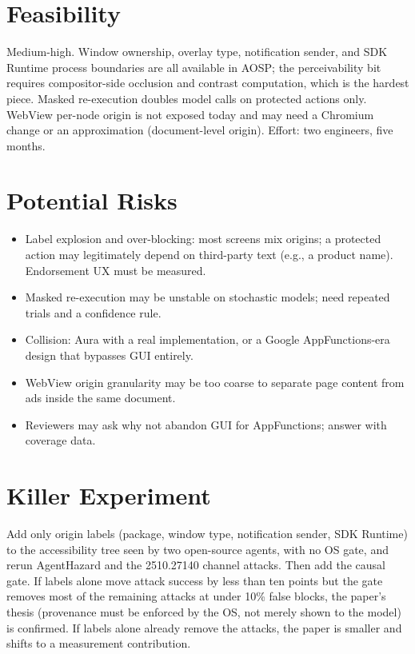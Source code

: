 \documentclass[11pt]{article}
\begin{document}
\section{Feasibility}
Medium-high. Window ownership, overlay type, notification sender, and SDK Runtime process boundaries are all available in AOSP; the perceivability bit requires compositor-side occlusion and contrast computation, which is the hardest piece. Masked re-execution doubles model calls on protected actions only. WebView per-node origin is not exposed today and may need a Chromium change or an approximation (document-level origin). Effort: two engineers, five months.

\section{Potential Risks}
\begin{itemize}
  \item Label explosion and over-blocking: most screens mix origins; a protected action may legitimately depend on third-party text (e.g., a product name). Endorsement UX must be measured.
  \item Masked re-execution may be unstable on stochastic models; need repeated trials and a confidence rule.
  \item Collision: Aura with a real implementation, or a Google AppFunctions-era design that bypasses GUI entirely.
  \item WebView origin granularity may be too coarse to separate page content from ads inside the same document.
  \item Reviewers may ask why not abandon GUI for AppFunctions; answer with coverage data.
\end{itemize}

\section{Killer Experiment}
Add only origin labels (package, window type, notification sender, SDK Runtime) to the accessibility tree seen by two open-source agents, with no OS gate, and rerun AgentHazard and the 2510.27140 channel attacks. Then add the causal gate. If labels alone move attack success by less than ten points but the gate removes most of the remaining attacks at under 10\% false blocks, the paper's thesis (provenance must be enforced by the OS, not merely shown to the model) is confirmed. If labels alone already remove the attacks, the paper is smaller and shifts to a measurement contribution.
\end{document}
